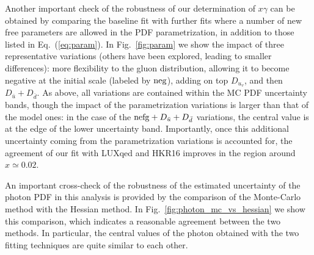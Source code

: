 Another important check of the robustness of our determination of
$x\gamma$ can be obtained by comparing the baseline fit with further
fits where a number of new free parameters are allowed in the PDF
parametrization, in addition to those listed in Eq.~(\ref{eq:param}).
%
In Fig.~\ref{fig:param} we show the impact of three representative
variations (others have been explored, leading to smaller
differences): more flexibility to the gluon distribution, allowing it
to become negative at the initial scale (labeled by ${\rm neg}$), adding on top $D_{u_v}$,
and then $D_{\bar{u}}+D_{\bar{d}}$.
%
As above, all variations are contained within the MC PDF uncertainty
bands, though the impact of the parametrization variations is larger
than that of the model ones: in the case of the
${\rm nefg}+D_{\bar{u}}+D_{\bar{d}}$ variations, the central value is
at the edge of the lower uncertainty band.
%
Importantly, once this additional uncertainty coming from the
parametrization variations is accounted for, the agreement of our fit
with LUXqed and HKR16 improves in the region around $x\simeq 0.02$.

An important cross-check of the robustness of the estimated
uncertainty of the photon PDF in this analysis is provided by the
comparison of the Monte-Carlo method with the Hessian method.
%
In Fig.~\ref{fig:photon_mc_vs_hessian} we show this comparison, which
indicates a reasonable agreement between the two methods.
%
In particular, the central values of the photon obtained with the two
fitting techniques are quite similar to each other.

